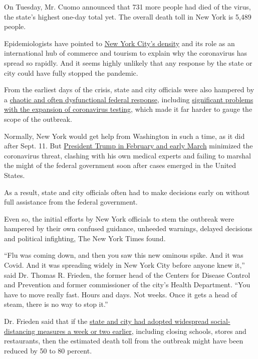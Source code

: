 On Tuesday, Mr. Cuomo announced that 731 more people had died of the
virus, the state's highest one-day total yet. The overall death toll in
New York is 5,489 people.

Epidemiologists have pointed to
\href{https://www.nytimes.com/2020/03/23/nyregion/coronavirus-nyc-crowds-density.html}{New
York City's density} and its role as an international hub of commerce
and tourism to explain why the coronavirus has spread so rapidly. And it
seems highly unlikely that any response by the state or city could have
fully stopped the pandemic.

From the earliest days of the crisis, state and city officials were also
hampered by a
\href{https://www.nytimes.com/2020/07/18/us/politics/trump-coronavirus-response-failure-leadership.html}{chaotic
and often dysfunctional federal response}, including
\href{https://www.nytimes.com/2020/03/28/us/testing-coronavirus-pandemic.html}{significant
problems with the expansion of coronavirus testing}, which made it far
harder to gauge the scope of the outbreak.

Normally, New York would get help from Washington in such a time, as it
did after Sept. 11. But
\href{https://www.nytimes.com/2020/04/01/us/politics/coronavirus-trump.html}{President
Trump in February and early March} minimized the coronavirus threat,
clashing with his own medical experts and failing to marshal the might
of the federal government soon after cases emerged in the United States.

As a result, state and city officials often had to make decisions early
on without full assistance from the federal government.

Even so, the initial efforts by New York officials to stem the outbreak
were hampered by their own confused guidance, unheeded warnings, delayed
decisions and political infighting, The New York Times found.

``Flu was coming down, and then you saw this new ominous spike. And it
was Covid. And it was spreading widely in New York City before anyone
knew it,'' said Dr. Thomas R. Frieden, the former head of the Centers
for Disease Control and Prevention and former commissioner of the city's
Health Department. ``You have to move really fast. Hours and days. Not
weeks. Once it gets a head of steam, there is no way to stop it.''

Dr. Frieden said that if the
\href{https://twitter.com/DrTomFrieden/status/1247184873615433729}{state
and city had adopted widespread social-distancing measures a week or two
earlier}, including closing schools, stores and restaurants, then the
estimated death toll from the outbreak might have been reduced by 50 to
80 percent.

